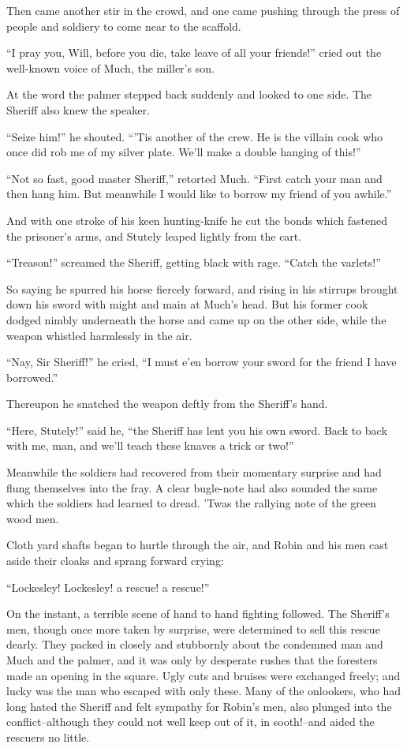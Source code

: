 Then came another stir in the crowd, and one came pushing through the
press of people and soldiery to come near to the scaffold.

``I pray you, Will, before you die, take leave of all your friends!''
cried out the well-known voice of Much, the miller's son.

At the word the palmer stepped back suddenly and looked to one side. The
Sheriff also knew the speaker.

``Seize him!'' he shouted. ``'Tis another of the crew. He is the villain
cook who once did rob me of my silver plate. We'll make a double hanging
of this!''

``Not so fast, good master Sheriff,'' retorted Much. ``First catch your
man and then hang him. But meanwhile I would like to borrow my friend of
you awhile.''

And with one stroke of his keen hunting-knife he cut the bonds which
fastened the prisoner's arms, and Stutely leaped lightly from the cart.

``Treason!'' screamed the Sheriff, getting black with rage. ``Catch the
varlets!''

So saying he spurred his horse fiercely forward, and rising in his
stirrups brought down his sword with might and main at Much's head. But
his former cook dodged nimbly underneath the horse and came up on the
other side, while the weapon whistled harmlessly in the air.

``Nay, Sir Sheriff!'' he cried, ``I must e'en borrow your sword for the
friend I have borrowed.''

Thereupon he snatched the weapon deftly from the Sheriff's hand.

``Here, Stutely!'' said he, ``the Sheriff has lent you his own sword.
Back to back with me, man, and we'll teach these knaves a trick or
two!''

Meanwhile the soldiers had recovered from their momentary surprise and
had flung themselves into the fray. A clear bugle-note had also sounded
the same which the soldiers had learned to dread. 'Twas the rallying
note of the green wood men.

Cloth yard shafts began to hurtle through the air, and Robin and his men
cast aside their cloaks and sprang forward crying:

``Lockesley! Lockesley! a rescue! a rescue!''

On the instant, a terrible scene of hand to hand fighting followed. The
Sheriff's men, though once more taken by surprise, were determined to
sell this rescue dearly. They packed in closely and stubbornly about the
condemned man and Much and the palmer, and it was only by desperate
rushes that the foresters made an opening in the square. Ugly cuts and
bruises were exchanged freely; and lucky was the man who escaped with
only these. Many of the onlookers, who had long hated the Sheriff and
felt sympathy for Robin's men, also plunged into the conflict--although
they could not well keep out of it, in sooth!--and aided the rescuers no
little.

